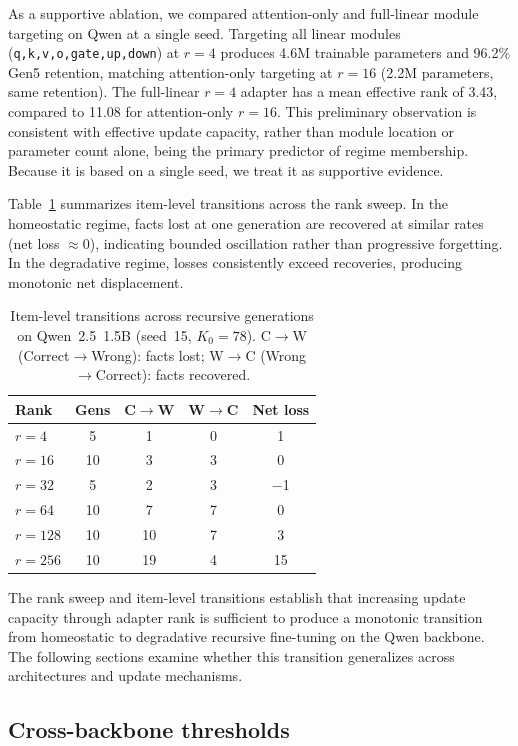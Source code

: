 \documentclass[a4paper,fleqn]{cas-dc}
\renewcommand{\arraystretch}{1.8}
\begin{document}
As a supportive ablation, we compared attention-only and full-linear module
targeting on Qwen at a single seed. Targeting all linear modules
(\texttt{q,k,v,o,gate,up,down}) at $r=4$ produces 4.6M trainable parameters and
96.2\% Gen5 retention, matching attention-only targeting at $r=16$ (2.2M
parameters, same retention). The full-linear $r=4$ adapter has a mean effective
rank of 3.43, compared to 11.08 for attention-only $r=16$. This preliminary
observation is consistent with effective update capacity, rather than module
location or parameter count alone, being the primary predictor of regime
membership. Because it is based on a single seed, we treat it as supportive
evidence.

Table~\ref{tab:transitions} summarizes item-level transitions across the rank
sweep. In the homeostatic regime, facts lost at one generation are recovered at
similar rates (net loss $\approx 0$), indicating bounded oscillation rather than
progressive forgetting. In the degradative regime, losses consistently exceed
recoveries, producing monotonic net displacement.

\begin{table}[htbp]
\caption{Item-level transitions across recursive generations on
Qwen~2.5~1.5B (seed~15, $K_0 = 78$). C$\to$W (Correct$\to$Wrong): facts lost;
W$\to$C (Wrong$\to$Correct): facts recovered.}\label{tab:transitions}
\footnotesize
\renewcommand{\arraystretch}{1.4}
\begin{tabular}{@{}lcccc@{}}
\toprule
Rank & Gens & C$\to$W & W$\to$C & Net loss \\
\midrule
$r=4$   & 5  & 1  & 0 & 1 \\
$r=16$  & 10 & 3  & 3 & 0 \\
$r=32$  & 5  & 2  & 3 & $-$1 \\
$r=64$  & 10 & 7  & 7 & 0 \\
$r=128$ & 10 & 10 & 7 & 3 \\
$r=256$ & 10 & 19 & 4 & 15 \\
\bottomrule
\end{tabular}
\end{table}

The rank sweep and item-level transitions establish that increasing update
capacity through adapter rank is sufficient to produce a monotonic transition
from homeostatic to degradative recursive fine-tuning on the Qwen backbone. The
following sections examine whether this transition generalizes across
architectures and update mechanisms.

\subsection{Cross-backbone thresholds}\label{sec:res_backbone}
\end{document}
